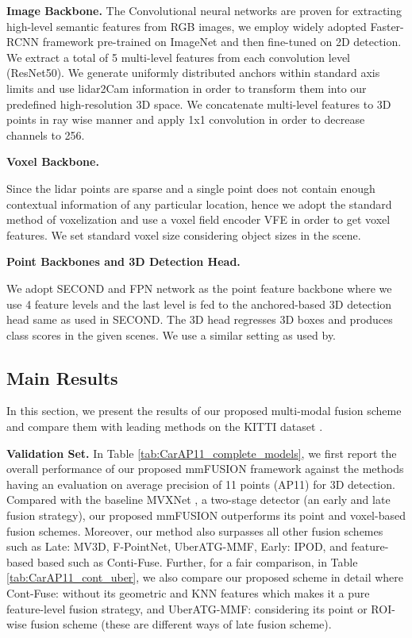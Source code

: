 \documentclass[10pt,twocolumn,letterpaper]{article}
\begin{document}
\textbf{Image Backbone.}
The Convolutional neural networks are proven for extracting high-level semantic features from RGB images, we employ widely adopted Faster-RCNN framework \cite{ren2015faster} pre-trained on ImageNet and then fine-tuned on 2D detection. We extract a total of 5 multi-level features from each convolution level (ResNet50). We generate uniformly distributed anchors within standard axis limits and use lidar2Cam information in order to transform them into our predefined high-resolution 3D space. We concatenate multi-level features to 3D points in ray wise manner and apply 1x1 convolution in order to decrease channels to 256. 

\textbf{Voxel Backbone.}

Since the lidar points are sparse and a single point does not contain enough contextual information of any particular location, hence we adopt the standard method of voxelization and use a voxel field encoder VFE \cite{zhou2018voxelnet} in order to get voxel features. We set standard voxel size considering object sizes in the scene.

\textbf{Point Backbones and 3D Detection Head.}

We adopt SECOND \cite{yan2018second} and FPN network \cite{lin2017feature} as the point feature backbone where we use 4 feature levels and the last level is fed to the anchored-based 3D detection head same as used in SECOND. The 3D head regresses 3D boxes and produces class scores in the given scenes. We use a similar setting as used by. 


\subsection{Main Results}
In this section, we present the results of our proposed multi-modal fusion scheme and compare them with leading methods on the KITTI dataset \cite{Geiger2012CVPR}.

\textbf{Validation Set.}
In Table \ref{tab:CarAP11_complete_models}, we first report the overall performance of our proposed mmFUSION framework against the methods having an evaluation on average precision of 11 points (AP11) for 3D detection. Compared with the baseline MVXNet \cite{sindagi2019mvx}, a two-stage detector (an early and late fusion strategy), our proposed mmFUSION outperforms its point and voxel-based fusion schemes. Moreover, our method also surpasses all other fusion schemes such as Late: MV3D, F-PointNet, UberATG-MMF, Early: IPOD, and feature-based based such as Conti-Fuse. Further, for a fair comparison, in Table \ref{tab:CarAP11_cont_uber}, we also compare our proposed scheme in detail where Cont-Fuse: without its geometric and KNN features which makes it a pure feature-level fusion strategy, and UberATG-MMF: considering its point or ROI-wise fusion scheme (these are different ways of late fusion scheme). 
\end{document}
